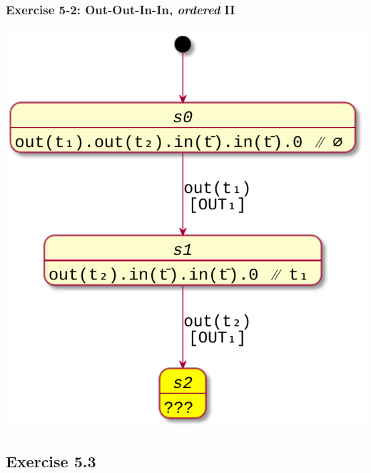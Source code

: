 \documentclass[presentation]{beamer}\mode<presentation>{\usetheme{AMSCesenaPurpleAndGold}}
\begin{document}
\begin{frame}
\frametitle{Exercise 5-2: Out-Out-In-In, \emph{ordered} II}

    \begin{center}
        \includegraphics[width=.5\linewidth]{img/out-out-in-in.pdf}
    \end{center}

\end{frame}

\subsection{Exercise 5.3}
\end{document}
